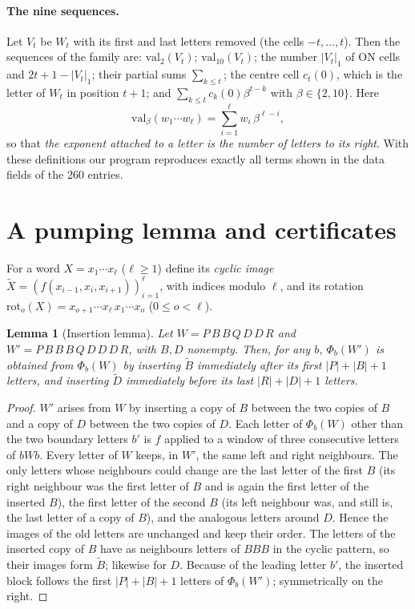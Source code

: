 \documentclass[11pt]{article}
\newtheorem{lemma}[theorem]{Lemma}
\theoremstyle{definition}
\theoremstyle{remark}
\begin{document}
\paragraph{The nine sequences.} Let $V_t$ be $W_t$ with its first and last letters removed (the cells $-t,\dots,t$). Then the sequences of the family are: $\mathrm{val}_2(V_t)$; $\mathrm{val}_{10}(V_t)$; the number $|V_t|_1$ of ON cells and $2t+1-|V_t|_1$; their partial sums $\sum_{k\le t}$; the centre cell $c_t(0)$, which is the letter of $W_t$ in position $t+1$; and $\sum_{k\le t}c_k(0)\beta^{t-k}$ with $\beta\in\{2,10\}$. Here
\[
\mathrm{val}_\beta(w_1\cdots w_\ell)=\sum_{i=1}^{\ell} w_i\,\beta^{\ell-i},
\]
so that \emph{the exponent attached to a letter is the number of letters to its right}. With these definitions our program reproduces exactly all terms shown in the data fields of the 260 entries.

\section{A pumping lemma and certificates}

For a word $X=x_1\cdots x_\ell$ ($\ell\ge1$) define its \emph{cyclic image} $\widetilde X=(f(x_{i-1},x_i,x_{i+1}))_{i=1}^{\ell}$, with indices modulo $\ell$, and its rotation $\mathrm{rot}_o(X)=x_{o+1}\cdots x_\ell\, x_1\cdots x_o$ ($0\le o<\ell$).

\begin{lemma}[Insertion lemma]\label{lem:ins}
Let $W=P\,B\,B\,Q\,D\,D\,R$ and $W'=P\,B\,B\,B\,Q\,D\,D\,D\,R$, with $B,D$ nonempty. Then, for any $b$, $\Phi_b(W')$ is obtained from $\Phi_b(W)$ by inserting $\widetilde B$ immediately after its first $|P|+|B|+1$ letters, and inserting $\widetilde D$ immediately before its last $|R|+|D|+1$ letters.
\end{lemma}
\begin{proof}
$W'$ arises from $W$ by inserting a copy of $B$ between the two copies of $B$ and a copy of $D$ between the two copies of $D$. Each letter of $\Phi_b(W)$ other than the two boundary letters $b'$ is $f$ applied to a window of three consecutive letters of $bWb$. Every letter of $W$ keeps, in $W'$, the same left and right neighbours. The only letters whose neighbours could change are the last letter of the first $B$ (its right neighbour was the first letter of $B$ and is again the first letter of the inserted $B$), the first letter of the second $B$ (its left neighbour was, and still is, the last letter of a copy of $B$), and the analogous letters around $D$. Hence the images of the old letters are unchanged and keep their order. The letters of the inserted copy of $B$ have as neighbours letters of $BBB$ in the cyclic pattern, so their images form $\widetilde B$; likewise for $D$. Because of the leading letter $b'$, the inserted block follows the first $|P|+|B|+1$ letters of $\Phi_b(W')$; symmetrically on the right.
\end{proof}
\end{document}
